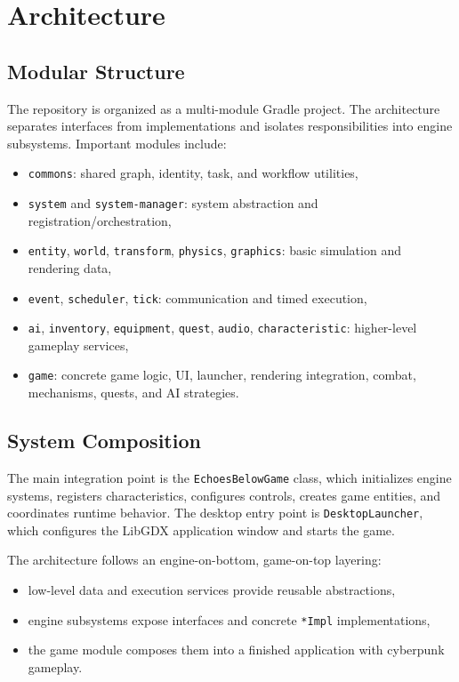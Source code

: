\documentclass[12pt]{extarticle}
\begin{document}
\section{Architecture}
\subsection{Modular Structure}
The repository is organized as a multi-module Gradle project. The architecture separates interfaces from implementations and isolates responsibilities into engine subsystems. Important modules include:
\begin{itemize}[leftmargin=1.5em]
    \item \texttt{commons}: shared graph, identity, task, and workflow utilities,
    \item \texttt{system} and \texttt{system-manager}: system abstraction and registration/orchestration,
    \item \texttt{entity}, \texttt{world}, \texttt{transform}, \texttt{physics}, \texttt{graphics}: basic simulation and rendering data,
    \item \texttt{event}, \texttt{scheduler}, \texttt{tick}: communication and timed execution,
    \item \texttt{ai}, \texttt{inventory}, \texttt{equipment}, \texttt{quest}, \texttt{audio}, \texttt{characteristic}: higher-level gameplay services,
    \item \texttt{game}: concrete game logic, UI, launcher, rendering integration, combat, mechanisms, quests, and AI strategies.
\end{itemize}

\subsection{System Composition}
The main integration point is the \texttt{EchoesBelowGame} class, which initializes engine systems, registers characteristics, configures controls, creates game entities, and coordinates runtime behavior. The desktop entry point is \texttt{DesktopLauncher}, which configures the LibGDX application window and starts the game.

The architecture follows an engine-on-bottom, game-on-top layering:
\begin{itemize}[leftmargin=1.5em]
    \item low-level data and execution services provide reusable abstractions,
    \item engine subsystems expose interfaces and concrete \texttt{*Impl} implementations,
    \item the game module composes them into a finished application with cyberpunk gameplay.
\end{itemize}
\end{document}
